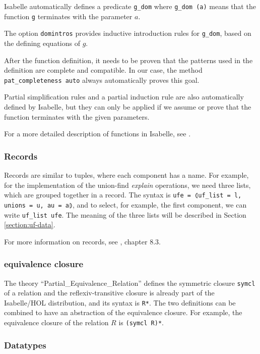 Isabelle automatically defines a predicate \lstinline|g_dom| where \lstinline{g_dom (a)} means that the function \lstinline|g| terminates with the parameter $a$.

The option \lstinline{domintros} provides inductive introduction rules for \lstinline|g_dom|, based on the defining equations of $g$.

After the function definition, it needs to be proven that the patterns used in the definition are complete and compatible. In our case, the method \lstinline|pat_completeness auto| always automatically proves this goal.

Partial simplification rules and a partial induction rule are also automatically defined by Isabelle, but they can only be applied if we assume or prove that the function terminates with the given parameters.

For a more detailed description of functions in Isabelle, see \cite{functions}.

\subsubsection{Records}

Records are similar to tuples, where each component has a name. For example, for the implementation of the union-find \emph{explain} operations, we need three lists, which are grouped together in a record. The syntax is \lstinline{ufe = ⦇uf_list = l, unions = u, au = a⦈}, and to select, for example, the first component, we can write \lstinline{uf_list ufe}. The meaning of the three lists will be described in Section \ref{section:uf-data}.

For more information on records, see \cite{isabelle}, chapter 8.3.

\subsubsection{equivalence closure}

The theory ``Partial\_Equivalence\_Relation''\cite{Collections-AFP} defines the symmetric closure \lstinline{symcl} of a relation and the reflexiv-transitive closure is already part of the Isabelle/HOL distribution, and its syntax is \lstinline{R*}. The two definitions can be combined to have an abstraction of the equivalence closure. For example, the equivalence closure of the relation $R$ is \lstinline{(symcl R)*}.

\subsubsection{Datatypes}
\label{subsubsection:datatypes}

